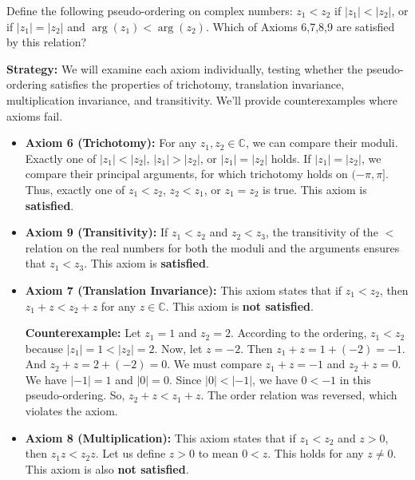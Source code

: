 \begin{problembox}
\begin{problemstatement}
Define the following pseudo-ordering on complex numbers: $z_1 < z_2$ if $|z_1| < |z_2|$, or if $|z_1|=|z_2|$ and $\arg(z_1) < \arg(z_2)$. Which of Axioms 6,7,8,9 are satisfied by this relation?
\end{problemstatement}
\end{problembox}

\noindent\textbf{Strategy:} We will examine each axiom individually, testing whether the pseudo-ordering satisfies the properties of trichotomy, translation invariance, multiplication invariance, and transitivity. We'll provide counterexamples where axioms fail.

\begin{itemize}
    \item \textbf{Axiom 6 (Trichotomy):} For any $z_1, z_2 \in \mathbb{C}$, we can compare their moduli. Exactly one of $|z_1| < |z_2|$, $|z_1| > |z_2|$, or $|z_1| = |z_2|$ holds. If $|z_1| = |z_2|$, we compare their principal arguments, for which trichotomy holds on $(-\pi, \pi]$. Thus, exactly one of $z_1 < z_2$, $z_2 < z_1$, or $z_1 = z_2$ is true. This axiom is \textbf{satisfied}.

    \item \textbf{Axiom 9 (Transitivity):} If $z_1 < z_2$ and $z_2 < z_3$, the transitivity of the $<$ relation on the real numbers for both the moduli and the arguments ensures that $z_1 < z_3$. This axiom is \textbf{satisfied}.

    \item \textbf{Axiom 7 (Translation Invariance):} This axiom states that if $z_1 < z_2$, then $z_1 + z < z_2 + z$ for any $z \in \mathbb{C}$. This axiom is \textbf{not satisfied}.
    
    \textbf{Counterexample:} Let $z_1 = 1$ and $z_2 = 2$. According to the ordering, $z_1 < z_2$ because $|z_1|=1 < |z_2|=2$.
    Now, let $z = -2$.
    Then $z_1 + z = 1 + (-2) = -1$.
    And $z_2 + z = 2 + (-2) = 0$.
    We must compare $z_1+z = -1$ and $z_2+z=0$.
    We have $|-1|=1$ and $|0|=0$. Since $|0| < |-1|$, we have $0 < -1$ in this pseudo-ordering.
    So, $z_2 + z < z_1 + z$. The order relation was reversed, which violates the axiom.

    \item \textbf{Axiom 8 (Multiplication):} This axiom states that if $z_1 < z_2$ and $z > 0$, then $z_1 z < z_2 z$. Let us define $z>0$ to mean $0<z$. This holds for any $z \neq 0$. This axiom is also \textbf{not satisfied}.
    

\end{itemize}
